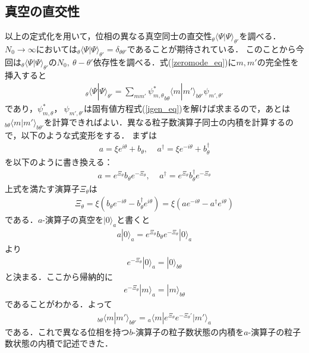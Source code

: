 \documentclass[10.5pt,a4paper]{jreport}
\begin{document}
\subsection{真空の直交性}
以上の定式化を用いて，位相の異なる真空同士の直交性$_\theta\langle\Psi|\Psi\rangle_{\theta '}$を調べる．$N_0\rightarrow \infty$においては$_\theta\langle\Psi|\Psi\rangle_{\theta '} = \delta_{\theta\theta'}$であることが期待されている．
このことから今回は$_\theta\langle\Psi|\Psi\rangle_{\theta '}$の$N_0,\ \theta - \theta '$依存性を調べる．式(\ref{zeromode_eq})に$m,m'$の完全性を挿入すると
\begin{eqnarray}
  _\theta\langle\Psi|\Psi\rangle_{\theta '} = \sum_{mm'}{\psi^*_{m,\theta}} _{b\theta}\langle m|m'\rangle_{b\theta'}\psi_{m',\theta'}
\end{eqnarray}
であり，$\psi^*_{m,\theta}，\ \psi_{m',\theta'}$は固有値方程式(\ref{igen_eq})を解けば求まるので，あとは$ _{b\theta}\langle m|m'\rangle_{b\theta'}$を計算できればよい．異なる粒子数演算子同士の内積を計算するので，以下のような式変形をする．
まずは
\begin{eqnarray}
  a = \xi e^{i\theta} + b_\theta,\ \ \ \ \ a^\dagger = \xi e^{-i\theta} + b^\dagger_\theta
\end{eqnarray}
を以下のように書き換える：
\begin{eqnarray}
  a =  e^{\Xi_\theta}b_\theta  e^{-\Xi_\theta},\ \ \ \ \ a^\dagger =  e^{\Xi_\theta}b^\dagger_\theta e^{-\Xi_\theta}
\end{eqnarray}
上式を満たす演算子$\Xi_\theta$は
\begin{eqnarray}
  \Xi_\theta = \xi\left(b_\theta e^{-i\theta} - b^\dagger_\theta e^{i\theta}\right) = \xi\left(ae^{-i\theta} - a^\dagger e^{i\theta}\right)
\end{eqnarray}
である．$a$-演算子の真空を$|0\rangle_a$と書くと
\begin{eqnarray}
  a|0\rangle_a = e^{\Xi_\theta}b_\theta  e^{-\Xi_\theta}|0\rangle_a
\end{eqnarray}
より
\begin{eqnarray}
  e^{-\Xi_\theta}|0\rangle_a = |0\rangle_{b\theta}
\end{eqnarray}
と決まる．ここから帰納的に
\begin{eqnarray}
  e^{-\Xi_\theta}|m\rangle_a = |m\rangle_{b\theta}
\end{eqnarray}
であることがわかる．よって
\begin{eqnarray}
  _{b\theta}\langle m|m'\rangle_{b\theta'} =  \!_a\langle m|e^{\Xi_\theta}e^{-\Xi_\theta '}|m'\rangle_a\label{inner_product}
\end{eqnarray}
である．これで異なる位相を持つ$b$-演算子の粒子数状態の内積を$a$-演算子の粒子数状態の内積で記述できた．
\end{document}

